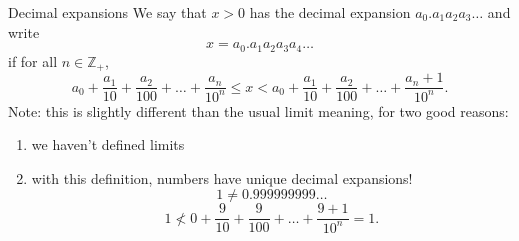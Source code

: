 \documentclass{beamer}
\begin{document}
\begin{frame}{Decimal expansions}
We say that $x>0$ has the decimal expansion $a_0.a_1a_2a_3\dots$ and write
$$x = a_0.a_1a_2a_3a_4\dots$$
\pause
if for all $n\in\mathbb{Z}_+$,
$$a_0 + \frac{a_1}{10} + \frac{a_2}{100} + \dots + \frac{a_n}{10^n}
\leq x < a_0 + \frac{a_1}{10} + \frac{a_2}{100} + \dots + \frac{a_n+1}{10^n}.
$$
\pause
Note: this is slightly different than the usual limit meaning, for two good reasons:
\begin{enumerate}
\pause
\item we haven't defined limits
\pause
\item with this definition, numbers have unique decimal expansions!
\pause
$$1\neq 0.999999999\dots$$
\pause
$$1 \nless 0 + \frac{9}{10} + \frac{9}{100} + \dots + \frac{9+1}{10^n} = 1.$$
\end{enumerate}
\end{frame}
\end{document}
